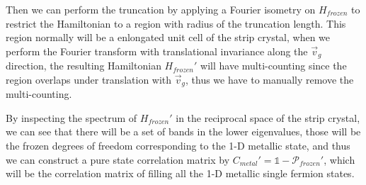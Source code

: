 \documentclass[%
    reprint,
    amsmath,amssymb,
    aps,
    floatfix,
]{revtex4-2}
\theoremstyle{plain}
\begin{document}
Then we can perform the truncation by applying a Fourier isometry on $H_{frozen}$ to restrict the Hamiltonian to a region with radius 
of the truncation length. This region normally will be a enlongated unit cell of the strip crystal, when we perform the Fourier transform with 
translational invariance along the $\vec{v}_{g}$ direction, the resulting Hamiltonian $H_{frozen}'$ will have multi-counting since the region overlaps 
under translation with $\vec{v}_{g}$, thus we have to manually remove the multi-counting.

By inspecting the spectrum of $H_{frozen}'$ in the reciprocal space of the strip crystal, we can see that there will be a set of bands in the lower 
eigenvalues, those will be the frozen degrees of freedom corresponding to the 1-D metallic state, and thus we can construct a pure state correlation matrix 
by $C_{metal}' = \mathds{1} - \mathcal{P}_{frozen}'$, which will be the correlation matrix of filling all the 1-D metallic single fermion states.
\end{document}
